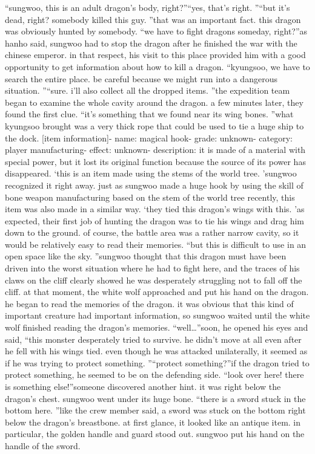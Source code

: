“sungwoo, this is an adult dragon’s body, right?”“yes, that’s right.
”“but it’s dead, right? somebody killed this guy.
”that was an important fact.
 this dragon was obviously hunted by somebody.
“we have to fight dragons someday, right?”as hanho said, sungwoo had to stop the dragon after he finished the war with the chinese emperor.
 in that respect, his visit to this place provided him with a good opportunity to get information about how to kill a dragon.
“kyungsoo, we have to search the entire place.
 be careful because we might run into a dangerous situation.
”“sure.
 i’ll also collect all the dropped items.
”the expedition team began to examine the whole cavity around the dragon.
 a few minutes later, they found the first clue.
“it’s something that we found near its wing bones.
”what kyungsoo brought was a very thick rope that could be used to tie a huge ship to the dock.
[item information]- name: magical hook- grade: unknown- category: player manufacturing- effect: unknown- description: it is made of a material with special power, but it lost its original function because the source of its power has disappeared.
‘this is an item made using the stems of the world tree.
’sungwoo recognized it right away.
 just as sungwoo made a huge hook by using the skill of bone weapon manufacturing based on the stem of the world tree recently, this item was also made in a similar way.
‘they tied this dragon’s wings with this.
’as expected, their first job of hunting the dragon was to tie his wings and drag him down to the ground.
 of course, the battle area was a rather narrow cavity, so it would be relatively easy to read their memories.
“but this is difficult to use in an open space like the sky.
”sungwoo thought that this dragon must have been driven into the worst situation where he had to fight here, and the traces of his claws on the cliff clearly showed he was desperately struggling not to fall off the cliff.
at that moment, the white wolf approached and put his hand on the dragon.
 he began to read the memories of the dragon.
 it was obvious that this kind of important creature had important information, so sungwoo waited until the white wolf finished reading the dragon’s memories.
“well…”soon, he opened his eyes and said, “this monster desperately tried to survive.
 he didn’t move at all even after he fell with his wings tied.
 even though he was attacked unilaterally, it seemed as if he was trying to protect something.
”“protect something?”if the dragon tried to protect something, he seemed to be on the defending side.
“look over here! there is something else!”someone discovered another hint.
 it was right below the dragon’s chest.
sungwoo went under its huge bone.
“there is a sword stuck in the bottom here.
”like the crew member said, a sword was stuck on the bottom right below the dragon’s breastbone.
at first glance, it looked like an antique item.
 in particular, the golden handle and guard stood out.
 sungwoo put his hand on the handle of the sword.


